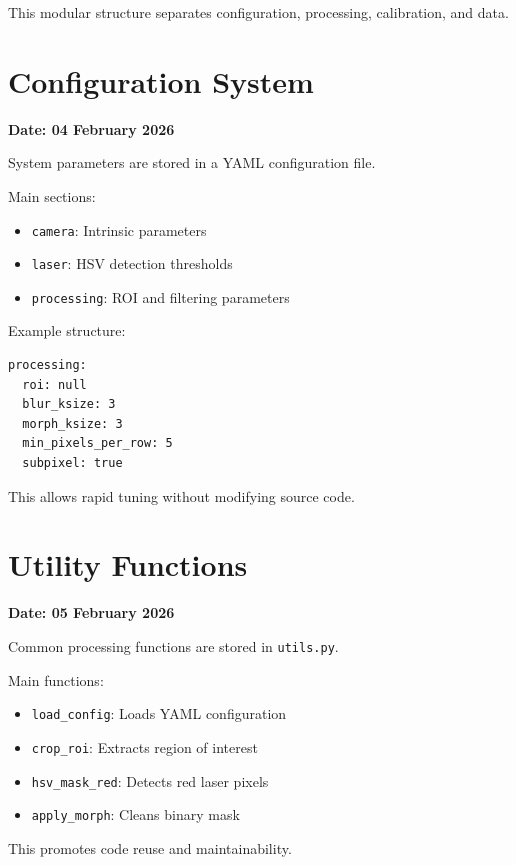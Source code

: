 \documentclass[11pt,a4paper]{article}
\begin{document}
This modular structure separates configuration, processing, calibration, and data.

\section{Configuration System}

\textbf{Date: 04 February 2026}

System parameters are stored in a YAML configuration file.

Main sections:

\begin{itemize}
  \item \texttt{camera}: Intrinsic parameters
  \item \texttt{laser}: HSV detection thresholds
  \item \texttt{processing}: ROI and filtering parameters
\end{itemize}

Example structure:

\begin{lstlisting}
processing:
  roi: null
  blur_ksize: 3
  morph_ksize: 3
  min_pixels_per_row: 5
  subpixel: true
\end{lstlisting}

This allows rapid tuning without modifying source code.

\section{Utility Functions}

\textbf{Date: 05 February 2026}

Common processing functions are stored in \texttt{utils.py}.

Main functions:

\begin{itemize}
  \item \texttt{load\_config}: Loads YAML configuration
  \item \texttt{crop\_roi}: Extracts region of interest
  \item \texttt{hsv\_mask\_red}: Detects red laser pixels
  \item \texttt{apply\_morph}: Cleans binary mask
\end{itemize}

This promotes code reuse and maintainability.
\end{document}
